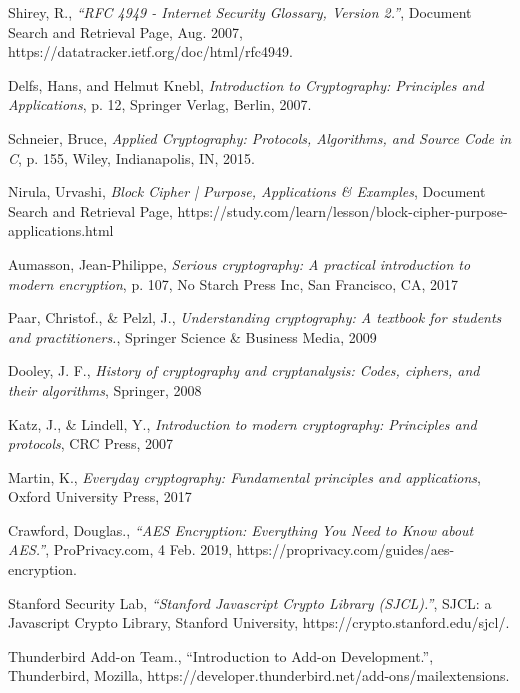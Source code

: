 \backmatter

\clearpage %
{}

\renewcommand{\bibname}{References}

\begin{thebibliography}{11}

  Shirey, R.,
  \emph{“RFC 4949 - Internet Security Glossary, Version 2.”},
  Document Search and Retrieval Page,
  Aug. 2007,
  https://datatracker.ietf.org/doc/html/rfc4949. 

  Delfs, Hans, and Helmut Knebl,
  \emph{Introduction to Cryptography: Principles and Applications},
  p. 12, Springer Verlag, Berlin,
  2007.
  
  Schneier, Bruce,
  \emph{Applied Cryptography: Protocols, Algorithms, and Source Code in C},
  p. 155, Wiley, Indianapolis, IN,
  2015.

  Nirula, Urvashi,
  \emph{Block Cipher | Purpose, Applications \& Examples},
  Document Search and Retrieval Page,
  https://study.com/learn/lesson/block-cipher-purpose-applications.html
  
  Aumasson, Jean-Philippe,
  \emph{Serious cryptography: A practical introduction to modern encryption},
  p. 107, No Starch Press Inc, San Francisco, CA, 
  2017
  
  Paar, Christof., \& Pelzl, J.,
 \emph{Understanding cryptography: A textbook for students and practitioners.},
  Springer Science \& Business Media,
  2009
  
  Dooley, J. F.,
  \emph{History of cryptography and cryptanalysis: Codes, ciphers, and their algorithms},
   Springer,
   2008
  
  Katz, J., \& Lindell, Y.,
  \emph{Introduction to modern cryptography: Principles and protocols},
  CRC Press,
  2007
  
  Martin, K.,
  \emph{Everyday cryptography: Fundamental principles and applications},
  Oxford University Press,
  2017
  
  Crawford, Douglas.,
  \emph{“AES Encryption: Everything You Need to Know about AES.”},
   ProPrivacy.com, 
   4 Feb. 2019, 
   https://proprivacy.com/guides/aes-encryption. 

  Stanford Security Lab,
  \emph {“Stanford Javascript Crypto Library (SJCL).”},
   SJCL: a Javascript Crypto Library, 
   Stanford University,
   https://crypto.stanford.edu/sjcl/.
   
  Thunderbird Add-on Team.,
  “Introduction to Add-on Development.”,
  Thunderbird, Mozilla, 
  https://developer.thunderbird.net/add-ons/mailextensions. 
   

\end{thebibliography}